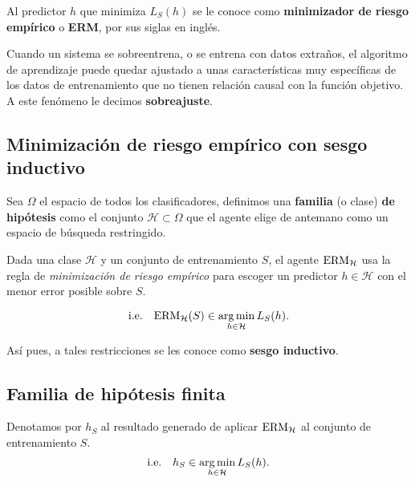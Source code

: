 \documentclass[8pt,a4paper]{extarticle}
\begin{document}
\begin{multicols}{3}
	\begin{boxdef}
		Al predictor $h$ que minimiza $L_S (h)$ se le conoce como \textbf{minimizador de riesgo empírico} o \textbf{ERM}, por sus siglas en inglés.
	\end{boxdef}

	\begin{boxdef}[Sobreajuste]
		Cuando un sistema se sobreentrena, o se entrena con datos extraños, el algoritmo de aprendizaje puede quedar ajustado a unas características muy específicas de los datos de entrenamiento que no tienen relación causal con la función objetivo. A este fenómeno le decimos \textbf{sobreajuste}.
	\end{boxdef}

	\subsection{Minimización de riesgo empírico con sesgo inductivo}

	\begin{boxdef}
		Sea $\Omega$ el espacio de todos los clasificadores, definimos una \textbf{familia} (o clase) \textbf{de hipótesis} como el conjunto $\mathcal{H} \subset \Omega$ que el agente elige de antemano como un espacio de búsqueda restringido.
	\end{boxdef}

	Dada una clase $\mathcal{H}$ y un conjunto de entrenamiento $S$, el agente  $\text{\normalfont ERM}_{\mathcal{H}}$ usa la regla de \emph{minimización de riesgo empírico} para escoger un predictor $h \in \mathcal{H}$ con el menor error posible sobre $S$.

	\[
		\text{\normalfont i.e.}\quad\text{\normalfont ERM}_{\mathcal{H}} (S) \in \operatorname*{\arg \min}_{h\in\mathcal{H}} L_S (h)
		.\]

	Así pues, a tales restricciones se les conoce como \textbf{sesgo inductivo}.

	\subsection{Familia de hipótesis finita}

	\begin{boxrmk}[]
		Denotamos por $h_S$ al resultado generado de aplicar  $\text{\normalfont ERM}_{\mathcal{H}}$ al conjunto de entrenamiento $S$.
		\[
			\text{\normalfont i.e.}\quad h_S \in \operatorname*{\arg \min}_{h \in \mathcal{H}} L_S (h)
			.\]
	\end{boxrmk}


\end{multicols}
\end{document}
